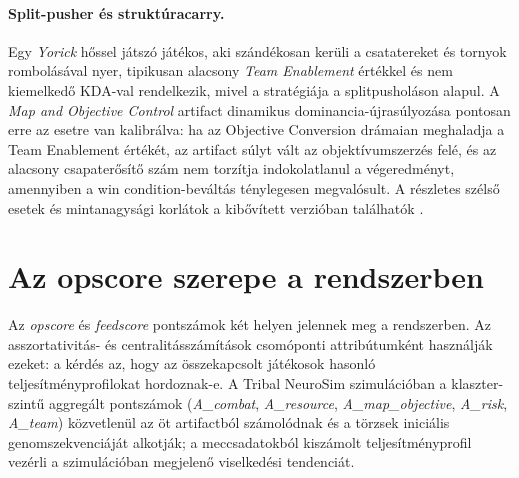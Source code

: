 \paragraph{Split-pusher és struktúracarry.}
Egy \textit{Yorick} hőssel játszó játékos, aki szándékosan kerüli a csatatereket és tornyok rombolásával nyer, tipikusan alacsony \textit{Team Enablement} értékkel és nem kiemelkedő KDA-val rendelkezik, mivel a stratégiája a splitpusholáson alapul. A \textit{Map and Objective Control} artifact dinamikus dominancia-újrasúlyozása pontosan erre az esetre van kalibrálva: ha az Objective Conversion drámaian meghaladja a Team Enablement értékét, az artifact súlyt vált az objektívumszerzés felé, és az alacsony csapaterősítő szám nem torzítja indokolatlanul a végeredményt, amennyiben a win condition-beváltás ténylegesen megvalósult. A részletes szélső esetek és mintanagysági korlátok a kibővített verzióban találhatók \cite{premadegraph-full}.

\section{Az opscore szerepe a rendszerben}

Az \textit{opscore} és \textit{feedscore} pontszámok két helyen jelennek meg a rendszerben. Az asszortativitás- és centralitásszámítások csomóponti attribútumként használják ezeket: a kérdés az, hogy az összekapcsolt játékosok hasonló teljesítményprofilokat hordoznak-e. A Tribal NeuroSim szimulációban a klaszter-szintű aggregált pontszámok (\textit{A\_combat}, \textit{A\_resource}, \textit{A\_map\_objective}, \textit{A\_risk}, \textit{A\_team}) közvetlenül az öt artifactból számolódnak és a törzsek iniciális genomszekvenciáját alkotják; a meccsadatokból kiszámolt teljesítményprofil vezérli a szimulációban megjelenő viselkedési tendenciát.
